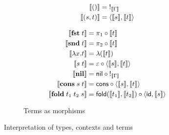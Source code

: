 \begin{figure}
\begin{subfigure}{0.8\linewidth}
\begin{minipage}{0.5\linewidth}
\begin{align*}
  \sem{\tmUnit} &=\;!_{\sem{\Gamma}}
  \\
    \sem{\tmPair{s}{t}} &= \prodM{\sem{s}}{\sem{t}}
  \end{align*}
\end{minipage}
\begin{minipage}{0.5\linewidth}
  \small
  \begin{align*}
  \sem{\tmFst{t}} &= \pi_1 \comp \sem{t}
  \\
  \sem{\tmSnd{t}} &= \pi_2 \comp \sem{t}
  \\
  \sem{\tmFun{x}{t}} &= \lambda(\sem{t})
  \\
  \sem{\tmApp{s}{t}} &= \eval \comp \prodM{\sem{s}}{\sem{t}}
  \\
  \sem{\tmNil} &= \nil \comp {!_{\sem{\Gamma}}}
  \\
  \sem{\tmCons{s}{t}} &= \cons \comp \prodM{\sem{s}}{\sem{t}}
  \\
  \sem{\tmFoldList{t_1}{t_2}{s}} &= \fold(\sem{t_1},\sem{t_2}) \comp \prodM{\id}{\sem{s}}
  \end{align*}
  \end{minipage}
  \caption{Terms as morphisms}
  \label{fig:semantics:terms}
\end{subfigure}
\caption{Interpretation of types, contexts and terms} %
\end{figure}
